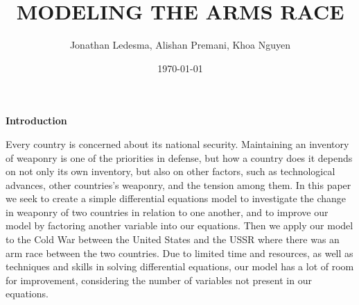 

\title{MODELING THE ARMS RACE}		%


\author{Jonathan Ledesma, Alishan Premani, Khoa Nguyen}					%


\date{\today}				%


\maketitle		%
			

\begin{center}
{\large \bfseries Introduction} %
\end{center}

Every country is concerned about its national security. Maintaining an inventory of weaponry is one of the priorities in defense, but how a country does it depends on not only its own inventory, but also on other factors, such as technological advances, other countries's weaponry, and the tension among them. In this paper we seek to create a simple differential equations model to investigate the change in weaponry of two countries in relation to one another, and to improve our model by factoring another variable into our equations. Then we apply our model to the Cold War between the United States and the USSR where there was an arm race between the two countries. Due to limited time and resources, as well as techniques and skills in solving differential equations, our model has a lot of room for improvement, considering the number of variables not present in our equations.

\newpage

